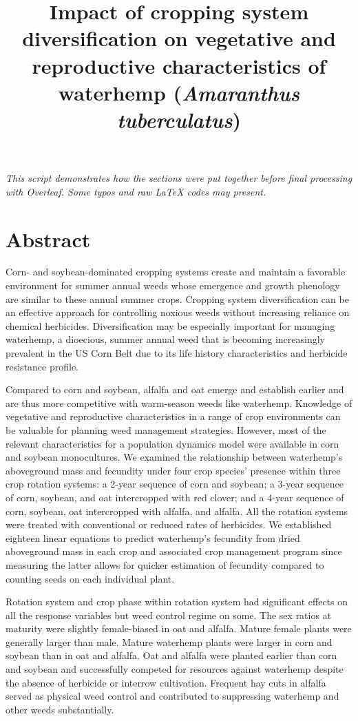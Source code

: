 \documentclass[
]{article}
\title{Impact of cropping system diversification on vegetative and reproductive characteristics of waterhemp (\emph{Amaranthus tuberculatus})}
\author{}
\date{\vspace{-2.5em}}
\begin{document}
\maketitle

\emph{This script demonstrates how the sections were put together before final processing with Overleaf. Some typos and raw LaTeX codes may present.}

\hypertarget{abstract}{%
\section*{Abstract}\label{abstract}}

Corn- and soybean-dominated cropping systems create and maintain a favorable environment for summer annual weeds whose emergence and growth phenology are similar to these annual summer crops. Cropping system diversification can be an effective approach for controlling noxious weeds without increasing reliance on chemical herbicides. Diversification may be especially important for managing waterhemp, a dioecious, summer annual weed that is becoming increasingly prevalent in the US Corn Belt due to its life history characteristics and herbicide resistance profile.

Compared to corn and soybean, alfalfa and oat emerge and establish earlier and are thus more competitive with warm-season weeds like waterhemp. Knowledge of vegetative and reproductive characteristics in a range of crop environments can be valuable for planning weed management strategies. However, most of the relevant characteristics for a population dynamics model were available in corn and soybean monocultures. We examined the relationship between waterhemp's aboveground mass and fecundity under four crop species' presence within three crop rotation systems: a 2-year sequence of corn and soybean; a 3-year sequence of corn, soybean, and oat intercropped with red clover; and a 4-year sequence of corn, soybean, oat intercropped with alfalfa, and alfalfa. All the rotation systems were treated with conventional or reduced rates of herbicides. We established eighteen linear equations to predict waterhemp's fecundity from dried aboveground mass in each crop and associated crop management program since measuring the latter allows for quicker estimation of fecundity compared to counting seeds on each individual plant.

Rotation system and crop phase within rotation system had significant effects on all the response variables but weed control regime on some. The sex ratios at maturity were slightly female-biased in oat and alfalfa. Mature female plants were generally larger than male. Mature waterhemp plants were larger in corn and soybean than in oat and alfalfa. Oat and alfalfa were planted earlier than corn and soybean and successfully competed for resources against waterhemp despite the absence of herbicide or interrow cultivation. Frequent hay cuts in alfalfa served as physical weed control and contributed to suppressing waterhemp and other weeds substantially.
\end{document}
